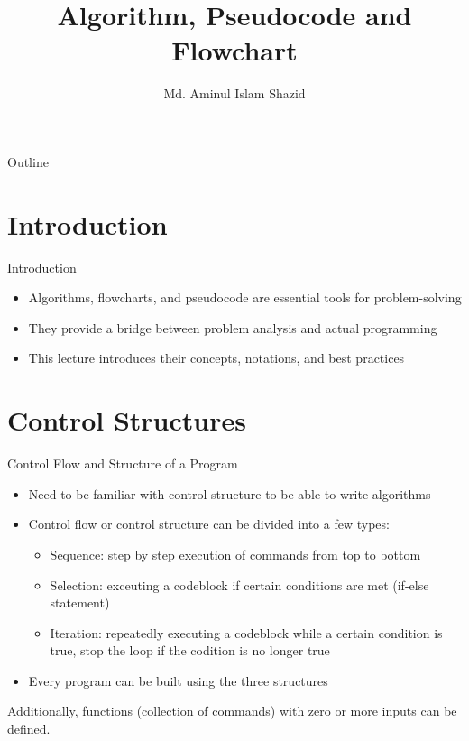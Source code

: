 \documentclass[12pt, aspectratio=169]{beamer}
\title{Algorithm, Pseudocode and Flowchart}
\author{Md. Aminul Islam Shazid}
\date{}
\begin{document}
    {
		\addtocounter{framenumber}{-2}    %

		\begin{frame}
			\titlepage
		\end{frame}

		\begin{frame}{Outline}
            \vfill
            \small
			\tableofcontents[subsectionstyle=hide]
            \vfill
		\end{frame}
	}


    \section{Introduction}
    \begin{frame}{Introduction}
        \begin{itemize}
            \item Algorithms, flowcharts, and pseudocode are essential tools for problem-solving
            \item They provide a bridge between problem analysis and actual programming
            \item This lecture introduces their concepts, notations, and best practices
        \end{itemize}
    \end{frame}


    \section{Control Structures}

    \begin{frame}{Control Flow and Structure of a Program}
        \begin{itemize}
            \item Need to be familiar with control structure to be able to write algorithms
            \item Control flow or control structure can be divided into a few types:
            \begin{itemize}
                \item Sequence: step by step execution of commands from top to bottom
                \item Selection: exceuting a codeblock if certain conditions are met (if-else statement)
                \item Iteration: repeatedly executing a codeblock while a certain condition is true, stop the loop if the codition is no longer true
            \end{itemize}
            \item Every program can be built using the three structures
        \end{itemize}

        \vspace{1em}

        Additionally, functions (collection of commands) with zero or more inputs can be defined.
    \end{frame}
\end{document}
